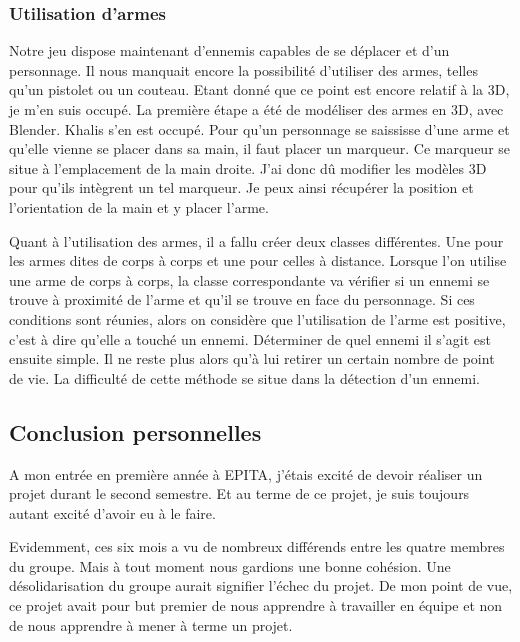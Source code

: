 \documentclass[12pt]{article}
\begin{document}
\subsubsection{Utilisation d'armes}

Notre jeu dispose maintenant d'ennemis capables de se déplacer et d'un personnage. Il nous manquait encore la possibilité d'utiliser des armes, telles qu'un pistolet ou un couteau. Etant donné que ce point est encore relatif à la 3D, je m'en suis occupé. La première étape a été de modéliser des armes en 3D, avec Blender. Khalis s'en est occupé. Pour qu'un personnage se saississe d'une arme et qu'elle vienne se placer dans sa main, il faut placer un marqueur. Ce marqueur se situe à l'emplacement de la main droite. J'ai donc dû modifier les modèles 3D pour qu'ils intègrent un tel marqueur. Je peux ainsi récupérer la position et l'orientation de la main et y placer l'arme.

Quant à l'utilisation des armes, il a fallu créer deux classes différentes. Une pour les armes dites de corps à corps et une pour celles à distance. Lorsque l'on utilise une arme de corps à corps, la classe correspondante va vérifier si un ennemi se trouve à proximité de l'arme et qu'il se trouve en face du personnage. Si ces conditions sont réunies, alors on considère que l'utilisation de l'arme est positive, c'est à dire qu'elle a touché un ennemi. Déterminer de quel ennemi il s'agit est ensuite simple. Il ne reste plus  alors qu'à lui retirer un certain nombre de point de vie. La difficulté de cette méthode se situe dans la détection d'un ennemi. 




\newpage

\subsection{Conclusion personnelles}

A mon entrée en première année à EPITA, j'étais excité de devoir réaliser un projet durant le second semestre. Et au terme de ce projet, je suis toujours autant excité d'avoir eu à le faire. 

Evidemment, ces six mois a vu de nombreux différends entre les quatre membres du groupe. Mais à tout moment nous gardions une bonne cohésion. Une désolidarisation du groupe aurait signifier l'échec du projet. De mon point de vue, ce projet avait pour but premier de nous apprendre à travailler en équipe et non de nous apprendre à mener à terme un projet. 
\end{document}
